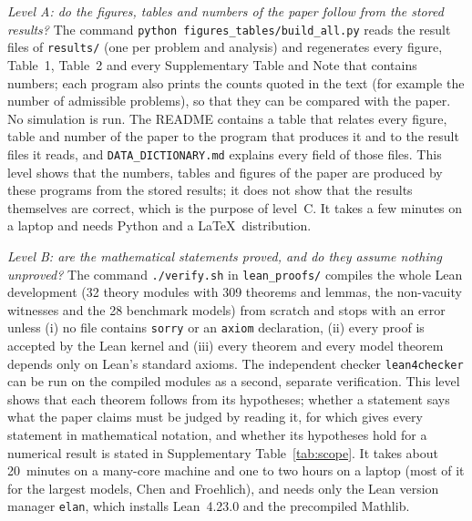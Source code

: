 \emph{Level A: do the figures, tables and numbers of the paper follow from the stored results?} The command \texttt{python figures\_tables/build\_all.py} reads the result files of \texttt{results/} (one per problem and analysis) and regenerates every figure, Table~1, Table~2 and every Supplementary Table and Note that contains numbers; each program also prints the counts quoted in the text (for example the number of admissible problems), so that they can be compared with the paper. No simulation is run. The README contains a table that relates every figure, table and number of the paper to the program that produces it and to the result files it reads, and \texttt{DATA\_DICTIONARY.md} explains every field of those files. This level shows that the numbers, tables and figures of the paper are produced by these programs from the stored results; it does not show that the results themselves are correct, which is the purpose of level~C. It takes a few minutes on a laptop and needs Python and a \LaTeX\ distribution.

\emph{Level B: are the mathematical statements proved, and do they assume nothing unproved?} The command \texttt{./verify.sh} in \texttt{lean\_proofs/} compiles the whole Lean development (32 theory modules with 309 theorems and lemmas, the non-vacuity witnesses and the 28 benchmark models) from scratch and stops with an error unless (i) no file contains \texttt{sorry} or an \texttt{axiom} declaration, (ii) every proof is accepted by the Lean kernel and (iii) every theorem and every model theorem depends only on Lean's standard axioms. The independent checker \texttt{lean4checker} can be run on the compiled modules as a second, separate verification. This level shows that each theorem follows from its hypotheses; whether a statement says what the paper claims must be judged by reading it, for which  gives every statement in mathematical notation, and whether its hypotheses hold for a numerical result is stated in Supplementary Table~\ref{tab:scope}. It takes about 20~minutes on a many-core machine and one to two hours on a laptop (most of it for the largest models, Chen and Froehlich), and needs only the Lean version manager \texttt{elan}, which installs Lean~4.23.0 and the precompiled Mathlib.

